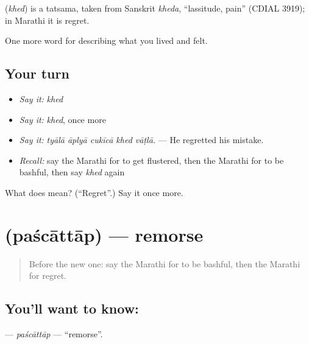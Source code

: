 \begin{cousinweb}
\textbf{} (\emph{khed}) is a tatsama, taken from Sanskrit \emph{kheda}, \textquotedblleft{}lassitude, pain\textquotedblright{} (CDIAL 3919); in Marathi it is regret.
\end{cousinweb}

\begin{grammarlens}[title={What you've built}]
One more word for describing what you lived and felt.
\end{grammarlens}

\subsection*{Your turn}
\begin{itemize}
\raggedright
  \item \emph{Say it:} \emph{khed}
  \item \emph{Say it:} \emph{khed}, once more
  \item \emph{Say it:} \emph{tyālā āplyā cukīcā khed vāṭlā.} — He regretted his mistake.
  \item \emph{Recall:} say the Marathi for to get flustered, then the Marathi for to be bashful, then say \emph{khed} again
\end{itemize}

\begin{tcolorbox}[breakable,colback=teal!4,colframe=teal!35!black,title={Before you move on}]
What does  mean? (\textquotedblleft{}Regret\textquotedblright{}.) Say it once more.
\end{tcolorbox}
\section[\texorpdfstring{\mr{पश्चात्ताप} (paścāttāp)}{पश्चात्ताप (paścāttāp)}]{ (paścāttāp) — remorse}

\label{lesson:MR-C457-pascattap}



\begin{quote}
Before the new one: say the Marathi for to be bashful, then the Marathi for regret.
\end{quote}

\subsection*{You'll want to know: }
\textbf{} — \emph{paścāttāp} — \textquotedblleft{}remorse\textquotedblright{}.

